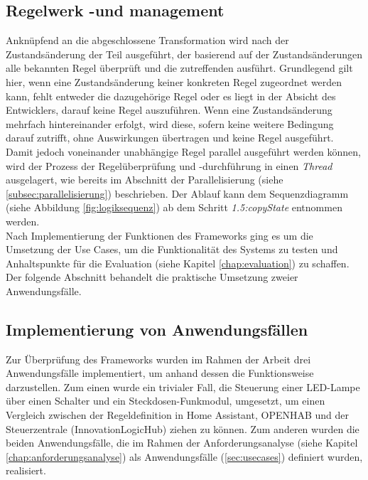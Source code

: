 \subsection{Regelwerk -und management}
    Anknüpfend an die abgeschlossene Transformation wird nach der Zustandsänderung der Teil ausgeführt, der basierend auf der Zustandsänderungen 
    alle bekannten Regel überprüft und die zutreffenden ausführt. Grundlegend gilt hier, wenn eine Zustandsänderung keiner konkreten Regel zugeordnet 
    werden kann, fehlt entweder die dazugehörige Regel oder es liegt in der Absicht des Entwicklers, darauf keine Regel auszuführen. Wenn eine 
    Zustandsänderung mehrfach hintereinander erfolgt, wird diese, sofern keine weitere Bedingung darauf zutrifft, ohne Auswirkungen übertragen 
    und keine Regel ausgeführt. Damit jedoch voneinander unabhängige Regel parallel ausgeführt werden können, wird der Prozess der Regelüberprüfung und -durchführung 
    in einen \textit{Thread} ausgelagert, wie bereits im Abschnitt der Parallelisierung (siehe \ref{subsec:parallelisierung}) beschrieben. Der Ablauf kann dem 
    Sequenzdiagramm (siehe Abbildung \ref{fig:logiksequenz}) ab dem Schritt \textit{1.5:copyState} entnommen werden. 
    \\
    \linebreak
    Nach Implementierung der Funktionen des Frameworks ging es um die Umsetzung der Use Cases, um die Funktionalität des Systems zu testen 
    und Anhaltspunkte für die Evaluation (siehe Kapitel \ref{chap:evaluation}) zu schaffen. Der folgende Abschnitt behandelt die praktische 
    Umsetzung zweier Anwendungsfälle. 

\subsection{Implementierung von Anwendungsfällen}
    Zur Überprüfung des Frameworks wurden im Rahmen der Arbeit drei Anwendungsfälle implementiert, um anhand dessen die Funktionsweise 
    darzustellen. Zum einen wurde ein trivialer Fall, die Steuerung einer LED-Lampe über einen Schalter und ein Steckdosen-Funkmodul, umgesetzt, um einen Vergleich zwischen der 
    Regeldefinition in Home Assistant, \acs{OPENHAB} und der Steuerzentrale (InnovationLogicHub) ziehen zu können. Zum anderen wurden die beiden 
    Anwendungsfälle, die im Rahmen der Anforderungsanalyse (siehe Kapitel \ref{chap:anforderungsanalyse}) als Anwendungsfälle (\ref{sec:usecases}) definiert wurden, realisiert. 
    
